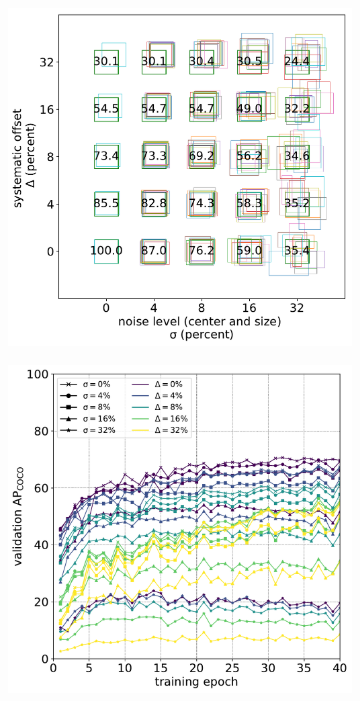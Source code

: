 \begin{figure}[phbt!]
\centering
\begin{subfigure}[t]{0.5\linewidth}
  \includegraphics[width=1.0\linewidth]{charts/training/noisy_boxes.pdf}
  \caption{}
\end{subfigure}%
\begin{subfigure}[t]{0.5\linewidth}
  \includegraphics[width=1.0\linewidth]{charts/training/noise_training.pdf}

\end{subfigure}
\end{figure}
